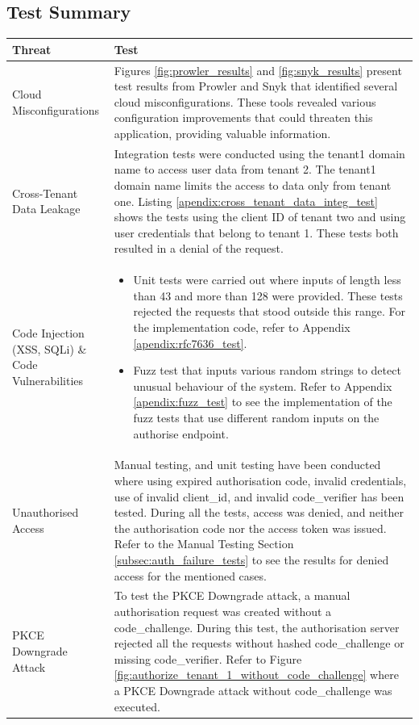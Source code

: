 \subsection{Test Summary}
\begin{longtable}{|p{5cm}|p{10cm}|}
\hline
\rowcolor{grey!15}
\textbf{Threat} & \textbf{Test} \\
\hline
\endhead
\hline
\endfoot
Cloud Misconfigurations &  Figures \ref{fig:prowler_results} and \ref{fig:snyk_results} present test results from Prowler and Snyk that identified several cloud misconfigurations. These tools revealed various configuration improvements that could threaten this application, providing valuable information. \\
\hline
Cross-Tenant Data Leakage & Integration tests were conducted using the tenant1 domain name to access user data from tenant 2. The tenant1 domain name limits the access to data only from tenant one. Listing \ref{apendix:cross_tenant_data_integ_test} shows the tests using the client ID of tenant two and using user credentials that belong to tenant 1. These tests both resulted in a denial of the request.\\
\hline
Code Injection (XSS, SQLi) \& Code Vulnerabilities & \begin{itemize}
    \item Unit tests were carried out where inputs of length less than 43 and more than 128 were provided. These tests rejected the requests that stood outside this range. For the implementation code, refer to Appendix \ref{apendix:rfc7636_test}.
    \item Fuzz test that inputs various random strings to detect unusual behaviour of the system. Refer to Appendix \ref{apendix:fuzz_test} to see the implementation of the fuzz tests that use different random inputs on the authorise endpoint.
\end{itemize}\\
\hline
 Unauthorised Access & Manual testing, and unit testing have been conducted where using expired authorisation code, invalid credentials, use of invalid client\_id, and invalid code\_verifier has been tested. During all the tests, access was denied, and neither the authorisation code nor the access token was issued. Refer to the Manual Testing Section \ref{subsec:auth_failure_tests} to see the results for denied access for the mentioned cases.\\
\hline
PKCE Downgrade Attack & To test the PKCE Downgrade attack, a manual authorisation request was created without a code\_challenge. During this test, the authorisation server rejected all the requests without hashed code\_challenge or missing code\_verifier. Refer to Figure \ref{fig:authorize_tenant_1_without_code_challenge} where a PKCE Downgrade attack without code\_challenge was executed.\\

\end{longtable}
